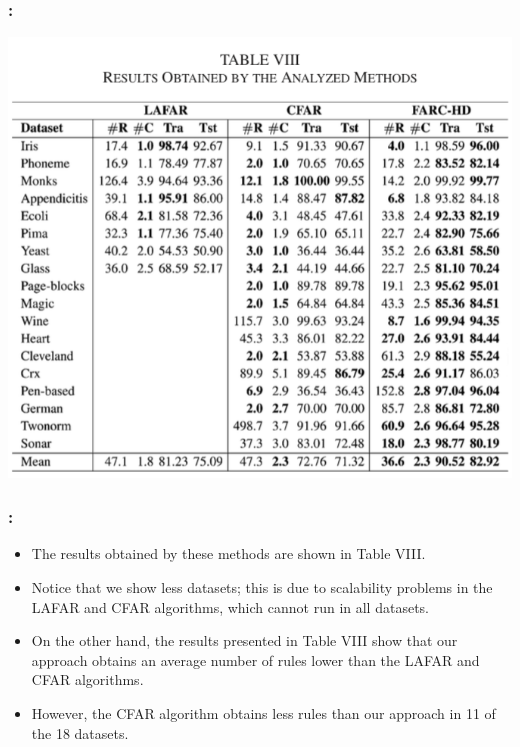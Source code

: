 \documentclass{beamer}
\begin{document}
\begin{CJK*}{UTF8}{bsmi}
\begin{frame}
	\frametitle{\insertsection : \insertsubsection}
	\begin{center}
		\includegraphics[height=.75\textheight]{./16.png}
	\end{center}
\end{frame}


\begin{frame}
	\frametitle{\insertsection : \insertsubsection}
	\begin{itemize}
		\item The results obtained by these methods are shown in Table VIII. 
		\item Notice that we show less datasets; this is due to scalability problems in the LAFAR and CFAR algorithms, which cannot run in all datasets.
		\item On the other hand, the results presented in Table VIII show that our approach obtains an average number of rules lower than the LAFAR and CFAR algorithms.
		\item However, the CFAR algorithm obtains less rules than our approach in 11 of the 18 datasets.
	\end{itemize}
\end{frame}



\end{CJK*}
\end{document}
